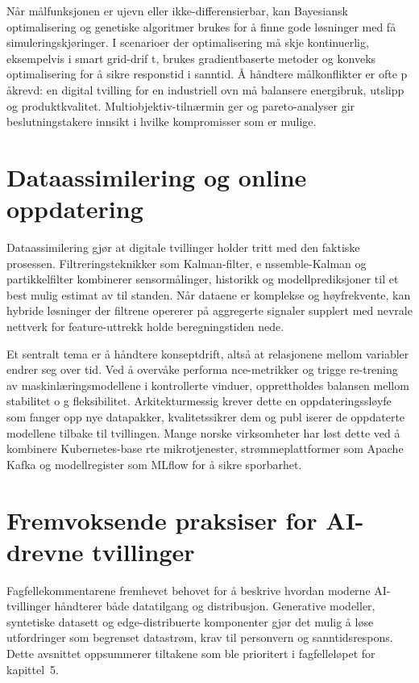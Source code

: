 Når målfunksjonen er ujevn eller ikke-differensierbar, kan Bayesiansk optimalisering og genetiske algoritmer brukes for å finne
gode løsninger med få simuleringskjøringer. I scenarioer der optimalisering må skje kontinuerlig, eksempelvis i smart grid-drif
t, brukes gradientbaserte metoder og konveks optimalisering for å sikre responstid i sanntid. Å håndtere målkonflikter er ofte p
åkrevd: en digital tvilling for en industriell ovn må balansere energibruk, utslipp og produktkvalitet. Multiobjektiv-tilnærmin
ger og pareto-analyser gir beslutningstakere innsikt i hvilke kompromisser som er mulige.

\section{Dataassimilering og online oppdatering}
Dataassimilering gjør at digitale tvillinger holder tritt med den faktiske prosessen. Filtreringsteknikker som Kalman-filter, e
nssemble-Kalman og partikkelfilter kombinerer sensormålinger, historikk og modellprediksjoner til et best mulig estimat av til
standen. Når dataene er komplekse og høyfrekvente, kan hybride løsninger der filtrene opererer på aggregerte signaler supplert
med nevrale nettverk for feature-uttrekk holde beregningstiden nede.

Et sentralt tema er å håndtere konseptdrift, altså at relasjonene mellom variabler endrer seg over tid. Ved å overvåke performa
nce-metrikker og trigge re-trening av maskinlæringsmodellene i kontrollerte vinduer, opprettholdes balansen mellom stabilitet o
g fleksibilitet. Arkitekturmessig krever dette en oppdateringssløyfe som fanger opp nye datapakker, kvalitetssikrer dem og publ
iserer de oppdaterte modellene tilbake til tvillingen. Mange norske virksomheter har løst dette ved å kombinere Kubernetes-base
rte mikrotjenester, strømmeplattformer som Apache Kafka og modellregister som MLflow for å sikre sporbarhet.

\section{Fremvoksende praksiser for AI-drevne tvillinger}
Fagfellekommentarene fremhevet behovet for å beskrive hvordan moderne AI-tvillinger håndterer både datatilgang og distribusjon. Generative modeller, syntetiske datasett og edge-distribuerte komponenter gjør det mulig å løse utfordringer som begrenset datastrøm, krav til personvern og sanntidsrespons. Dette avsnittet oppsummerer tiltakene som ble prioritert i fagfelleløpet for kapittel~5.

